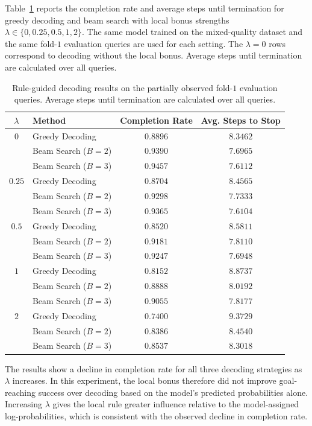 ﻿\documentclass[12pt,a4paper]{article}
\theoremstyle{definition}
\begin{document}
Table~\ref{tab:partial_rule_guided_results} reports the completion rate and average steps until termination
for greedy decoding and beam search with local bonus strengths $\lambda\in\{0,0.25,0.5,1,2\}$.
The same model trained on the mixed-quality dataset and the same fold-$1$ evaluation queries
are used for each setting. The $\lambda=0$ rows correspond to decoding without the local bonus.
Average steps until termination are calculated over all queries.

\begin{table}[H]
\centering
\caption{Rule-guided decoding results on the partially observed fold-$1$ evaluation queries. Average steps until termination are calculated over all queries.}
\label{tab:partial_rule_guided_results}
\footnotesize
\begin{tabular}{clcc}
\hline
$\lambda$ & Method & Completion Rate & Avg. Steps to Stop \\
\hline
$0$ & Greedy Decoding & $0.8896$ & $8.3462$ \\
      & Beam Search ($B=2$) & $0.9390$ & $7.6965$ \\
      & Beam Search ($B=3$) & $0.9457$ & $7.6112$ \\
$0.25$ & Greedy Decoding & $0.8704$ & $8.4565$ \\
         & Beam Search ($B=2$) & $0.9298$ & $7.7333$ \\
         & Beam Search ($B=3$) & $0.9365$ & $7.6104$ \\
$0.5$ & Greedy Decoding & $0.8520$ & $8.5811$ \\
        & Beam Search ($B=2$) & $0.9181$ & $7.8110$ \\
        & Beam Search ($B=3$) & $0.9247$ & $7.6948$ \\
$1$ & Greedy Decoding & $0.8152$ & $8.8737$ \\
      & Beam Search ($B=2$) & $0.8888$ & $8.0192$ \\
      & Beam Search ($B=3$) & $0.9055$ & $7.8177$ \\
$2$ & Greedy Decoding & $0.7400$ & $9.3729$ \\
      & Beam Search ($B=2$) & $0.8386$ & $8.4540$ \\
      & Beam Search ($B=3$) & $0.8537$ & $8.3018$ \\
\hline
\end{tabular}
\end{table}

The results show a decline in completion rate for all three decoding strategies as $\lambda$ increases.
In this experiment, the local bonus therefore did not improve goal-reaching success over decoding
based on the model's predicted probabilities alone. Increasing $\lambda$ gives the local rule greater
influence relative to the model-assigned log-probabilities, which is consistent with the observed
decline in completion rate.
\end{document}
